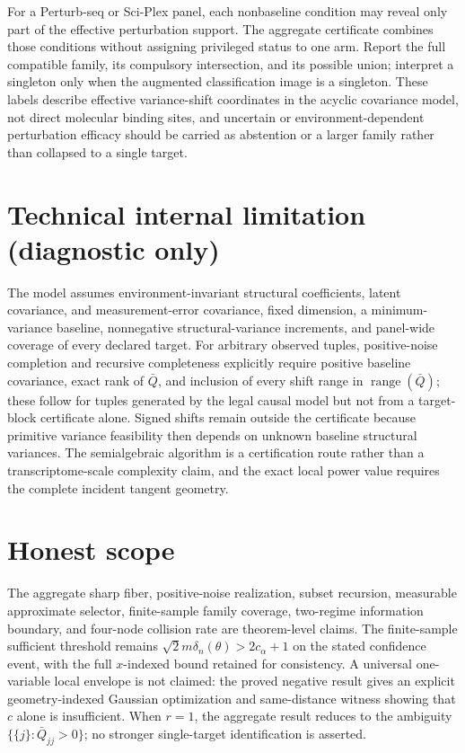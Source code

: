 \documentclass{article}
\begin{document}
For a Perturb-seq or Sci-Plex panel, each nonbaseline condition may reveal only part of the effective perturbation support.  The aggregate certificate combines those conditions without assigning privileged status to one arm.  Report the full compatible family, its compulsory intersection, and its possible union; interpret a singleton only when the augmented classification image is a singleton.  These labels describe effective variance-shift coordinates in the acyclic covariance model, not direct molecular binding sites, and uncertain or environment-dependent perturbation efficacy should be carried as abstention or a larger family rather than collapsed to a single target.

\section*{Technical internal limitation (diagnostic only)}

The model assumes environment-invariant structural coefficients, latent covariance, and measurement-error covariance, fixed dimension, a minimum-variance baseline, nonnegative structural-variance increments, and panel-wide coverage of every declared target.  For arbitrary observed tuples, positive-noise completion and recursive completeness explicitly require positive baseline covariance, exact rank of \(\bar Q\), and inclusion of every shift range in \(\operatorname{range}(\bar Q)\); these follow for tuples generated by the legal causal model but not from a target-block certificate alone.  Signed shifts remain outside the certificate because primitive variance feasibility then depends on unknown baseline structural variances.  The semialgebraic algorithm is a certification route rather than a transcriptome-scale complexity claim, and the exact local power value requires the complete incident tangent geometry.

\section{Honest scope}

The aggregate sharp fiber, positive-noise realization, subset recursion, measurable approximate selector, finite-sample family coverage, two-regime information boundary, and four-node collision rate are theorem-level claims.  The finite-sample sufficient threshold remains \(\sqrt{2}m\delta_n(\theta)>2c_{\alpha}+1\) on the stated confidence event, with the full \(x\)-indexed bound retained for consistency.  A universal one-variable local envelope is not claimed: the proved negative result gives an explicit geometry-indexed Gaussian optimization and same-distance witness showing that \(c\) alone is insufficient.  When \(r=1\), the aggregate result reduces to the ambiguity \(\{\{j\}:\bar Q_{jj}>0\}\); no stronger single-target identification is asserted.
\end{document}
